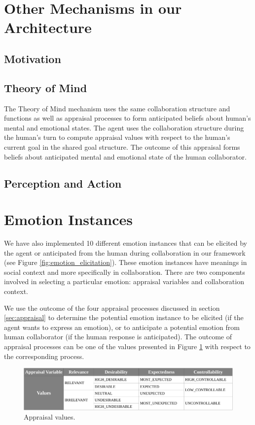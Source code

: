 \documentclass[12pt]{report}
\begin{document}
\section{Other Mechanisms in our Architecture}

\subsection{Motivation}
\label{sec:motivation_mechanism}

\subsection{Theory of Mind}
The Theory of Mind mechanism uses the same collaboration structure and functions
as well as appraisal processes to form anticipated beliefs about human's mental
and emotional states. The agent uses the collaboration structure during the
human's turn to compute appraisal values with respect to the human's current
goal in the shared goal structure. The outcome of this appraisal forms beliefs
about anticipated mental and emotional state of the human collaborator.

\subsection{Perception and Action}

\section{Emotion Instances}
We have also implemented 10 different emotion instances that can be elicited by
the agent or anticipated from the human during collaboration in our framework
(see Figure \ref{fig:emotion_elicitation}). These emotion instances have
meanings in social context and more specifically in collaboration. There are two
components involved in selecting a particular emotion: appraisal variables and
collaboration context.

We use the outcome of the four appraisal processes discussed in section
\ref{sec:appraisal} to determine the potential emotion instance to be elicited
(if the agent wants to express an emotion), or to anticipate a potential emotion
from human collaborator (if the human response is anticipated). The outcome of
appraisal processes can be one of the values presented in Figure
\ref{fig:appraisal_values} with respect to the corresponding process.

\begin{figure}[tbh]
  \centering
  \includegraphics[width=1\textwidth]{figure/apraisal_values_croped.pdf}
  \caption{Appraisal values.}
  \label{fig:appraisal_values}
\end{figure}
\end{document}

